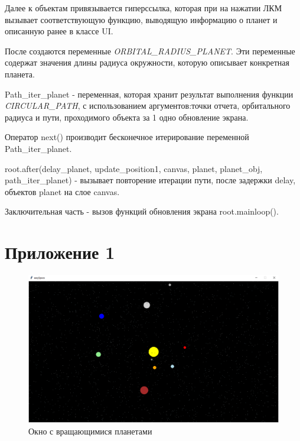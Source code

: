 \documentclass[11pt,a4paper]{report}
\begin{document}
Далее к объектам привязывается гиперссылка, которая при на нажатии ЛКМ вызывает соответствующую функцию, выводящую информацию о планет и  описанную ранее в классе UI.  

После создаются переменные \textit{ORBITAL\_RADIUS\_PLANET}. Эти переменные содержат значения длины радиуса окружности, которую описывает конкретная планета.

Path\_iter\_planet  - переменная, которая хранит результат выполнения функции \textit{CIRCULAR\_PATH}, с использованием аргументов:точки отчета, орбитального радиуса и пути, проходимого объекта за 1 одно обновление экрана.

Оператор next() производит бесконечное итерирование переменной Path\_iter\_planet.

root.after(delay\_planet, update\_position1, canvas, planet, planet\_obj, path\_iter\_planet) - вызывает повторение итерации пути, после задержки delay, объектов planet на слое canvas.

Заключительная часть - вызов функций обновления экрана root.mainloop().








\newpage
\section{Приложение 1}

\begin{figure}[h]
\centering
\includegraphics[width=0.75\linewidth]{2.png}
\caption{Окно с вращающимися планетами}
\label{fig:mpr}
\end{figure}
\end{document}
